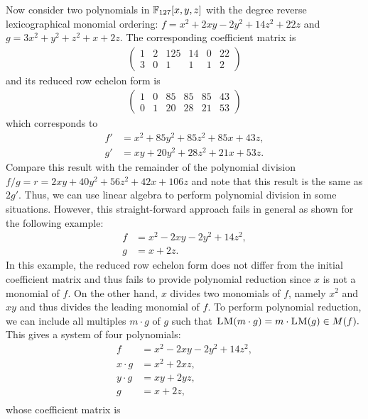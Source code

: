 Now consider two polynomials in $\mathbb{F}_{127}[x,y,z]$ with the degree reverse lexicographical monomial ordering: $f = x^2 + 2xy - 2y^2 + 14z^2 + 22z$ and $g = 3x^2 + y^2 + z^2 + x + 2z$. The corresponding coefficient matrix is
\begin{align*}
\left(\begin{array}{rrrrrr}
1 & 2 & 125 & 14 & 0 & 22 \\
3 & 0 & 1 & 1 & 1 & 2
\end{array}\right)
\end{align*}
and its reduced row echelon form is
\begin{align*}
\left(\begin{array}{rrrrrr}
1 & 0 & 85 & 85 & 85 & 43 \\
0 & 1 & 20 & 28 & 21 & 53
\end{array}\right)
\end{align*}
which corresponds to 
\begin{align*}
f' &= x^{2} + 85 y^{2} + 85 z^{2} + 85 x + 43 z,\\
g' &= x y + 20 y^{2} + 28 z^{2} + 21 x + 53 z.
\end{align*}
Compare this result with the remainder of the polynomial division $f / g = r = 2 x y + 40 y^{2} + 56 z^{2} + 42 x + 106 z$ and note that this result is the same as $2g'$. Thus, we can use linear algebra to perform polynomial division in some situations. However, this straight-forward approach fails in general as shown for the following example:
\begin{align*}
f &= x^2 - 2xy - 2y^2 + 14z^2,\\
g &= x + 2z.
\end{align*}
In this example, the reduced row echelon form does not differ from the initial coefficient matrix and thus fails to provide polynomial reduction since $x$ is not a monomial of $f$. On the other hand, $x$ divides two monomials of $f$, namely $x^2$ and $xy$ and thus divides the leading monomial of $f$. To perform polynomial reduction, we can include all multiples $m \cdot g$ of $g$ such that $\textsc{LM}(m \cdot g) = m \cdot \textsc{LM}(g) \in M(f).$
This gives a system of four polynomials:
\begin{align*}
f &= x^2 - 2xy - 2y^2 + 14z^2,\\
x \cdot g &= x^{2} + 2xz,\\
y \cdot g &= xy + 2yz,\\
g &= x + 2z,\\
\end{align*}
whose coefficient matrix is
